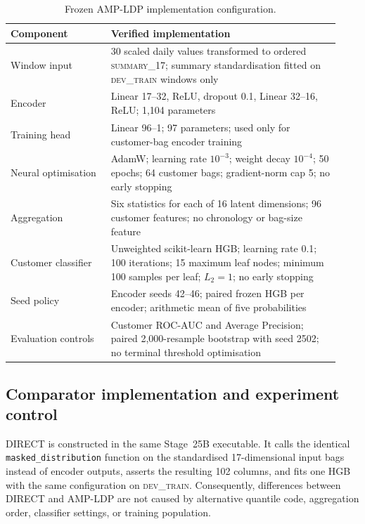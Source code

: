 \begin{table}[t]
\caption{Frozen AMP-LDP implementation configuration.}
\label{tab:implementation-configuration}
\centering
\small
\begin{tabular}{@{}p{0.29\linewidth}p{0.64\linewidth}@{}}
\toprule
Component & Verified implementation \\
\midrule
Window input & 30 scaled daily values transformed to ordered \textsc{summary\_17}; summary standardisation fitted on \textsc{dev\_train} windows only \\
Encoder & Linear 17--32, ReLU, dropout 0.1, Linear 32--16, ReLU; 1,104 parameters \\
Training head & Linear 96--1; 97 parameters; used only for customer-bag encoder training \\
Neural optimisation & AdamW; learning rate $10^{-3}$; weight decay $10^{-4}$; 50 epochs; 64 customer bags; gradient-norm cap 5; no early stopping \\
Aggregation & Six statistics for each of 16 latent dimensions; 96 customer features; no chronology or bag-size feature \\
Customer classifier & Unweighted scikit-learn HGB; learning rate 0.1; 100 iterations; 15 maximum leaf nodes; minimum 100 samples per leaf; $L_2=1$; no early stopping \\
Seed policy & Encoder seeds 42--46; paired frozen HGB per encoder; arithmetic mean of five probabilities \\
Evaluation controls & Customer ROC-AUC and Average Precision; paired 2,000-resample bootstrap with seed 2502; no terminal threshold optimisation \\
\bottomrule
\end{tabular}
\end{table}

\subsection{Comparator implementation and experiment control}

DIRECT is constructed in the same Stage~25B executable. It calls the identical \texttt{masked\_distribution} function on the standardised 17-dimensional input bags instead of encoder outputs, asserts the resulting 102 columns, and fits one HGB with the same configuration on \textsc{dev\_train}. Consequently, differences between DIRECT and AMP-LDP are not caused by alternative quantile code, aggregation order, classifier settings, or training population.

